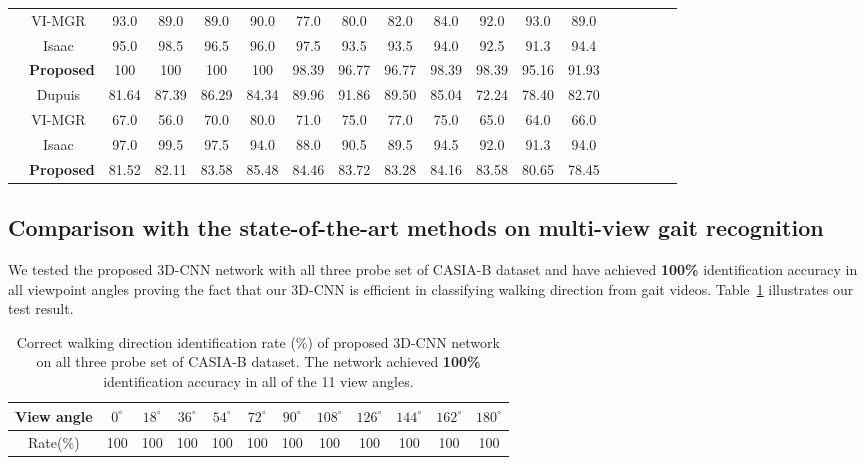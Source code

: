 \begin{table}[t]
{\begin{tabular*}{\textwidth}{|c|c|cccccccccccccccc}
		&VI-MGR~\cite{Choudhury_15} &93.0 &89.0 &89.0 &90.0 &77.0 &80.0 &82.0 &84.0 &92.0 &93.0 &89.0 \\\cline{2-13}\rule{0pt}{3ex}

		&Isaac~\cite{Isaac_17} &95.0 &98.5 &96.5 &96.0 &97.5 &93.5 &93.5 &94.0 &92.5 &91.3 &94.4 \\\cline{2-13}\rule{0pt}{3ex}

		&\textbf{Proposed}  &100 &100 &100 &100 &98.39 &96.77 &96.77 &98.39 &98.39 &95.16 &91.93 \\\hline\rule{0pt}{3ex}


		\multirow{4}{*}{\rotatebox{90}{Coat}} &Dupuis~\cite{Dupuis_13} &81.64 &87.39 &86.29 &84.34 &89.96 &91.86 &89.50 &85.04 &72.24 &78.40 &82.70\\\cline{2-13}\rule{0pt}{3ex}
		
		&VI-MGR~\cite{Choudhury_15} &67.0 &56.0 &70.0 &80.0 &71.0 &75.0 &77.0 &75.0 &65.0 &64.0 &66.0 \\\cline{2-13}\rule{0pt}{3ex}
		
		&Isaac~\cite{Isaac_17} &97.0 &99.5 &97.5 &94.0 &88.0 &90.5 &89.5 &94.5 &92.0 &91.3 &94.0 \\\cline{2-13}\rule{0pt}{3ex}
		
		&\textbf{Proposed} &81.52 &82.11 &83.58 &85.48 &84.46 &83.72 &83.28 &84.16 &83.58 &80.65 &78.45 \\\cline{1-13}
\end{tabular*}}{} 
\end{table}


\subsection{Comparison with the state-of-the-art methods on multi-view gait recognition}
We tested the proposed 3D-CNN network with all three probe set of CASIA-B dataset and have achieved \textbf{100\%} identification accuracy in all viewpoint angles proving the fact that our 3D-CNN is efficient in classifying walking direction from gait videos. Table~\ref{table:result_wd_identification} illustrates our test result. 


\begin{table}[t]
	\centering
	\caption{Correct walking direction identification rate (\%) of proposed 3D-CNN network on all three probe set of CASIA-B dataset. The network achieved \textbf{100\%} identification accuracy in all of the 11 view angles. \label{table:result_wd_identification}}
	{\begin{tabular*}{35pc}{cccc cccc cccc}\hline \noalign{\smallskip}
			View angle &${0^{\circ}}$	&${18^{\circ}}$  &${36^{\circ}}$ &${54^{\circ}}$	&${72^{\circ}}$	&${90^{\circ}}$	&${108^{\circ}}$ &${126^{\circ}}$ &${144^{\circ}}$ &${162^{\circ}}$  &${180^{\circ}}$ \\\hline \noalign{\smallskip}
			
			Rate(\%) &100 &100 &100 &100 &100 &100 &100 &100 &100 &100 &100 \\ \hline
	\end{tabular*}}{}
\end{table}

